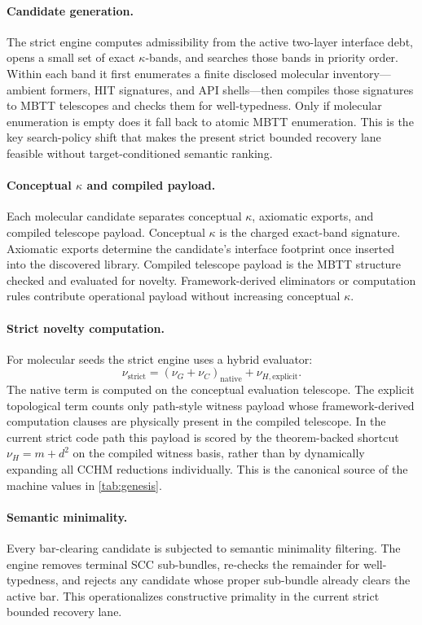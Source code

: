 \documentclass[11pt,a4paper]{article}
\theoremstyle{plain}
\theoremstyle{definition}
\theoremstyle{remark}
\begin{document}
\paragraph{Candidate generation.}
The strict engine computes admissibility from the active two-layer interface debt, opens a small set of exact $\kappa$-bands, and searches those bands in priority order.
Within each band it first enumerates a finite disclosed molecular inventory---ambient formers, HIT signatures, and API shells---then compiles those signatures to MBTT telescopes and checks them for well-typedness.
Only if molecular enumeration is empty does it fall back to atomic MBTT enumeration.
This is the key search-policy shift that makes the present strict bounded recovery lane feasible without target-conditioned semantic ranking.

\paragraph{Conceptual $\kappa$ and compiled payload.}
Each molecular candidate separates conceptual $\kappa$, axiomatic exports, and compiled telescope payload.
Conceptual $\kappa$ is the charged exact-band signature.
Axiomatic exports determine the candidate's interface footprint once inserted into the discovered library.
Compiled telescope payload is the MBTT structure checked and evaluated for novelty.
Framework-derived eliminators or computation rules contribute operational payload without increasing conceptual $\kappa$.

\paragraph{Strict novelty computation.}
For molecular seeds the strict engine uses a hybrid evaluator:
\[
  \nu_{\mathrm{strict}} = (\nu_G+\nu_C)_{\mathrm{native}} + \nu_{H,\mathrm{explicit}}.
\]
The native term is computed on the conceptual evaluation telescope.
The explicit topological term counts only path-style witness payload whose framework-derived computation clauses are physically present in the compiled telescope.
In the current strict code path this payload is scored by the theorem-backed shortcut $\nu_H=m+d^2$ on the compiled witness basis, rather than by dynamically expanding all CCHM reductions individually.
This is the canonical source of the machine values in \cref{tab:genesis}.

\paragraph{Semantic minimality.}
Every bar-clearing candidate is subjected to semantic minimality filtering.
The engine removes terminal SCC sub-bundles, re-checks the remainder for well-typedness, and rejects any candidate whose proper sub-bundle already clears the active bar.
This operationalizes constructive primality in the current strict bounded recovery lane.
\end{document}
